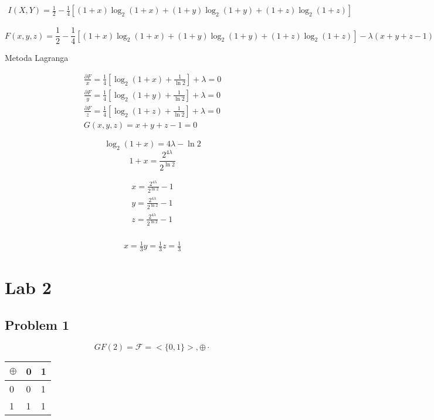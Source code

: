 \documentclass[12pt]{article}
\begin{document}
\begin{multline*}
    I(X,Y) = \frac{1}{2}- \frac{1}{4} [(1+x)\log_2(1+x)+(1+y)\log_2(1+y)+(1+z)\log_2(1+z)]
\end{multline*}

$$F(x,y,z) = \frac{1}{2}- \frac{1}{4} [(1+x)\log_2(1+x)+(1+y)\log_2(1+y)+(1+z)\log_2(1+z)] - \lambda (x+y+z-1)$$

Metoda Lagranga 

\begin{align*}
    \frac{\partial F}{x} = \frac{1}{4}[\log_2(1+x) + \frac{1}{\ln2}] + \lambda = 0 \\
    \frac{\partial F}{y} = \frac{1}{4}[\log_2(1+y) + \frac{1}{\ln2}] + \lambda = 0 \\
    \frac{\partial F}{z} = \frac{1}{4}[\log_2(1+z) + \frac{1}{\ln2}] + \lambda = 0 \\
    G(x,y,z) = x+y+z - 1 = 0
\end{align*}

$$ \log_2(1+x) = 4\lambda - \ln 2 $$
$$ 1+x = \frac{2^{4\lambda}}{2^{\ln 2}} $$

\begin{align*}
    x = \frac{2^{4\lambda}}{2^{\ln 2}} - 1 \\
    y = \frac{2^{4\lambda}}{2^{\ln 2}} - 1 \\
    z = \frac{2^{4\lambda}}{2^{\ln 2}} - 1 \\
\end{align*}

\begin{align*}
    x= \frac{1}{3}
    y= \frac{1}{3}
    z= \frac{1}{3}
\end{align*}

\section*{Lab 2}

\subsection*{Problem 1}

$$GF(2) = \mathcal{F} = < \{0,1 \}>, \oplus \cdot $$

\begin{table}[h]
\begin{tabular}{l|ll}
$\oplus$  & 0 & 1 \\ \hline
0 & 0 & 1 \\
1 & 1 & 1
\end{tabular}
\end{table}
\end{document}
